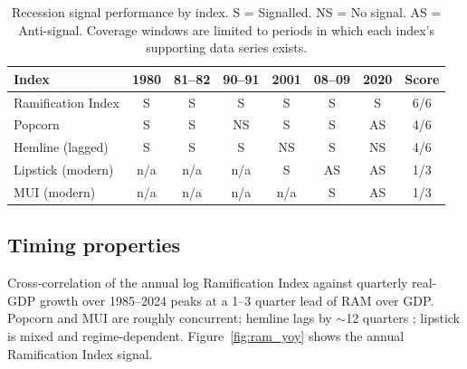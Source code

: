\documentclass[11pt,a4paper]{article}
\begin{document}
\begin{table}[h]
\centering
\caption{Recession signal performance by index. S = Signalled. NS = No signal. AS = Anti-signal. Coverage windows are limited to periods in which each index's supporting data series exists.}
\label{tab:coverage}
\small
\begin{tabular}{lccccccc}
\toprule
Index & 1980 & 81--82 & 90--91 & 2001 & 08--09 & 2020 & Score \\
\midrule
Ramification Index & S & S & S & S & S & S & 6/6 \\
Popcorn   & S & S & NS & S & S & AS & 4/6 \\
Hemline (lagged) & S & S & S & NS & S & NS & 4/6 \\
Lipstick (modern) & n/a & n/a & n/a & S & AS & AS & 1/3 \\
MUI (modern)      & n/a & n/a & n/a & n/a & S & AS & 1/3 \\
\bottomrule
\end{tabular}
\end{table}

\subsection{Timing properties}

Cross-correlation of the annual log Ramification Index against quarterly real-GDP growth over 1985--2024 peaks at a 1--3 quarter lead of RAM over GDP. Popcorn and MUI are roughly concurrent; hemline lags by $\sim$12 quarters \citep{baardwijk2010}; lipstick is mixed and regime-dependent. Figure~\ref{fig:ram_yoy} shows the annual Ramification Index signal.
\end{document}
